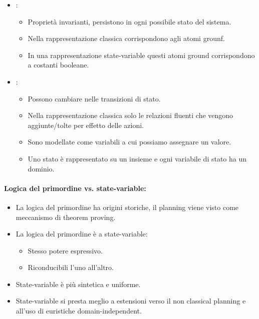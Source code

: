 \begin{itemize}
  \item {}:
    \begin{itemize}
      \item Proprietà invarianti, persistono in ogni possibile stato del sistema. 
      \item Nella rappresentazione classica corrispondono agli atomi grounf. 
      \item In una rappresentazione state-variable questi atomi ground corrispondono a costanti booleane. 
    \end{itemize}
  \item {}: 
    \begin{itemize}
      \item Possono cambiare nelle transizioni di stato. 
      \item Nella rappresentazione classica solo le relazioni fluenti che vengono aggiunte/tolte per effetto delle azioni. 
      \item Sono modellate come variabili a cui possiamo assegnare un valore. 
      \item Uno stato è rappresentato su un insieme e ogni variabile di stato ha un dominio.
    \end{itemize}
\end{itemize}

\paragraph{Logica del primordine vs. state-variable:}

\begin{itemize}
  \item La logica del primordine ha origini storiche, il planning viene visto come meccanismo di theorem proving. 
  \item La logica del primordine è  a state-variable:
    \begin{itemize}
      \item Stesso potere espressivo. 
      \item Riconducibili l'uno all'altro. 
    \end{itemize}
  \item State-variable è più sintetica e uniforme. 
  \item State-variable si presta meglio a estensioni verso il non classical planning e all'uso di euristiche domain-independent.
\end{itemize}

